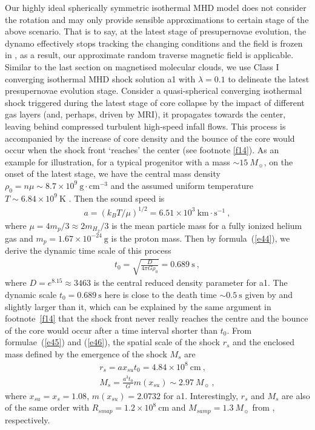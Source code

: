\documentclass[fleqn,usenatbib]{mnras}
\begin{document}
Our highly ideal spherically symmetric isothermal MHD model does not consider the rotation and may only provide sensible approximations to certain stage of the above scenario. That is to say, at the latest stage of presupernovae evolution, the dynamo effectively stops tracking the changing conditions and the field is frozen in \citep{heger2005presupernova}, as a result, our approximate random traverse magnetic field is applicable. Similar to the last section on magnetised molecular clouds, we use Class I converging isothermal MHD shock solution a1 with $\lambda=0.1$ to delineate the latest presupernovae evolution stage. Consider a quasi-spherical converging isothermal shock triggered during the latest stage of core collapse by the impact of different gas layers (and, perhaps, driven by MRI), it propagates towards the center, leaving behind compressed turbulent high-speed infall flows. This process is accompanied by the increase of core density and the bounce of the core would occur when the shock front `reaches' the center (see footnote \ref{f14}). As an example for illustration, for a typical progenitor with a mass $\sim 15~M_{\sun}$, on the onset of the latest stage, we have the central mass density $\rho_{0}=n\mu\sim 8.7\times 10^{9}~\mathrm{g\cdot cm^{-3}}$ and the assumed uniform temperature $T\sim 6.84\times 10^{9}~\mathrm{K}$ \citep{heger2005presupernova}. Then the sound speed is
\begin{gather}
a=(k_{B}T/\mu)^{1/2}=6.51\times 10^{3}~\mathrm{km\cdot s^{-1}}\ ,\label{e50}
\end{gather}
where $\mu=4m_{p}/3\approx 2m_{H_{2}}/3$ is the mean particle mass for a fully ionized helium gas and $m_{p}=1.67\times 10^{-24}~\mathrm{g}$ is the proton mass. Then by formula~(\ref{e44}), we derive the dynamic time scale of this process
\begin{gather}
t_{0}=\sqrt{\frac{D}{4\pi G\rho_{0}}}=0.689~\mathrm{s}\ ,
\end{gather}
where $D=e^{8.15}\approx 3463$ is the central reduced density parameter for a1. The dynamic scale $t_{0}=0.689~\mathrm{s}$ here is close to the death time $\sim 0.5~\mathrm{s}$ given by \citet{heger2005presupernova} and slightly larger than it, which can be explained by the same argument in footnote~\ref{f14} that the shock front never really reaches the centre and the bounce of the core would occur after a time interval shorter than $t_{0}$. From formulae~(\ref{e45}) and (\ref{e46}), the spatial scale of the shock $r_{s}$ and the enclosed mass defined by the emergence of the shock $M_{s}$ are
\begin{gather}
r_{s}=ax_{su}t_{0}=4.84\times 10^{8}~\mathrm{cm}\ ,\\
M_{s}=\frac{a^{3}t_{0}}{G}m(x_{su})\sim 2.97~M_{\sun}\ , 
\end{gather}
where $x_{su}=x_{s}=1.08$, $m(x_{su})=2.0732$ for a1. Interestingly, $r_{s}$ and $M_{s}$ are also of the same order with $R_{smap}=1.2\times 10^{8}~\mathrm{cm}$ and $M_{samp}=1.3~M_{\sun}$ from \citet{heger2005presupernova}, respectively.
\end{document}
